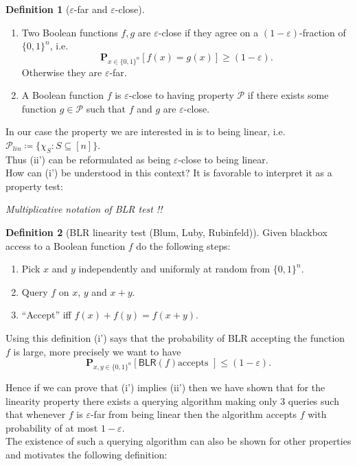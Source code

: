 \documentclass[a4paper]{article}
\newcommand{\prob}{\mathbf{P}}
\newcommand{\prty}{\mathcal{P}}
\newcommand{\nset}{[n]}
\newcommand{\eps}{\varepsilon}
\theoremstyle{plain}
\theoremstyle{definition}
\newtheorem{definition}{Definition}
\begin{document}
\begin{definition}[\(\eps\)-far and \(\eps\)-close]
  \begin{enumerate}[label=(\roman*)]
  \item Two Boolean functions \(f,g\) are \(\eps\)-close if they agree
    on a \((1-\eps)\)-fraction of \(\{0,1\}^n\), i.e. 
    \[\prob_{x\in\{0,1\}^n}\left[f(x) = g(x)\right] \geq (1-\eps).\]
    Otherwise they are \(\eps\)-far. 
  \item A Boolean function \(f\) is \(\eps\)-close to having property
    \(\prty\) if there exists some function \(g\in \prty\) such that
    \(f\) and \(g\) are \(\eps\)-close. 
  \end{enumerate}
\end{definition}

\noindent In our case the property we are interested in is to being
linear, i.e. \(\prty_{lin} \coloneqq \{\chi_S: S \subseteq
\nset\}\). \\ 
Thus (ii') can be reformulated as being \(\eps\)-close to being
linear. \\

How can (i') be understood in this context? It is favorable to
interpret it as a property test: 

\emph{Multiplicative notation of BLR test !!}

\begin{definition}[\textsf{BLR} linearity test (Blum, Luby, Rubinfeld)]
  Given blackbox access to a Boolean function \(f\) do the following
  steps: 
  \begin{enumerate}
  \item Pick \(x\) and \(y\) independently and uniformly at random
    from \(\{0,1\}^n\).
  \item Query \(f\) on \(x\), \(y\) and \(x+y\).
  \item ``Accept'' iff \(f(x) + f(y) = f(x+y)\). 
  \end{enumerate}
\end{definition}

\noindent Using this definition (i') says that the probability of
\textsf{BLR} accepting the function \(f\) is large, more precisely we
want to have \[\prob_{x,y \in \{0,1\}^n}\left[\textsf{BLR}(f) \text{
    accepts }\right] \leq (1-\eps).\]

\noindent Hence if we can prove that (i') implies (ii') then we have
shown that for the linearity property there exists a querying
algorithm making only \(3\) queries such that whenever \(f\) is
\(\eps\)-far from being linear then the algorithm accepts \(f\) with
probability of at most \(1-\eps\). \\
The existence of such a querying algorithm can also be shown for other
properties and motivates the following definition: 
\end{document}
